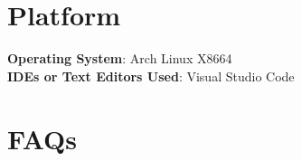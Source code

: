 \documentclass[11pt]{article}
\begin{document}
\section{Platform}
\textbf{Operating System}: Arch Linux X8664 \\
\textbf{IDEs or Text Editors Used}: Visual Studio Code\\

% 
\section{FAQs}
\end{document}
